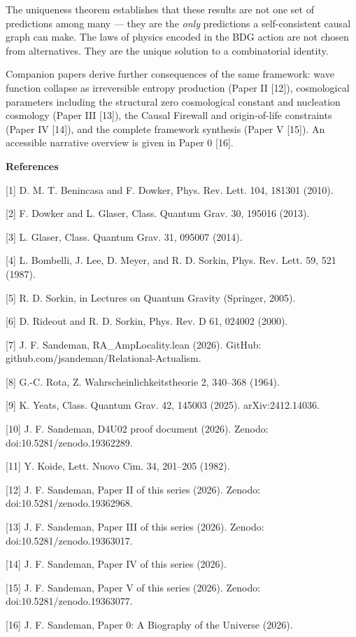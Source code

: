 \documentclass[12pt,a4paper]{article}
\begin{document}
The uniqueness theorem establishes that these results are not one set of
predictions among many --- they are the \emph{only} predictions a
self-consistent causal graph can make. The laws of physics encoded in
the BDG action are not chosen from alternatives. They are the unique
solution to a combinatorial identity.

Companion papers derive further consequences of the same framework: wave
function collapse as irreversible entropy production (Paper II
{[}12{]}), cosmological parameters including the structural zero
cosmological constant and nucleation cosmology (Paper III {[}13{]}), the
Causal Firewall and origin-of-life constraints (Paper IV {[}14{]}), and
the complete framework synthesis (Paper V {[}15{]}). An accessible
narrative overview is given in Paper 0 {[}16{]}.

\textbf{References}

{[}1{]} D. M. T. Benincasa and F. Dowker, Phys. Rev. Lett. 104, 181301
(2010).

{[}2{]} F. Dowker and L. Glaser, Class. Quantum Grav. 30, 195016 (2013).

{[}3{]} L. Glaser, Class. Quantum Grav. 31, 095007 (2014).

{[}4{]} L. Bombelli, J. Lee, D. Meyer, and R. D. Sorkin, Phys. Rev.
Lett. 59, 521 (1987).

{[}5{]} R. D. Sorkin, in Lectures on Quantum Gravity (Springer, 2005).

{[}6{]} D. Rideout and R. D. Sorkin, Phys. Rev. D 61, 024002 (2000).

{[}7{]} J. F. Sandeman, RA\_AmpLocality.lean (2026). GitHub:
github.com/jsandeman/Relational-Actualism.

{[}8{]} G.-C. Rota, Z. Wahrscheinlichkeitstheorie 2, 340--368 (1964).

{[}9{]} K. Yeats, Class. Quantum Grav. 42, 145003 (2025).
arXiv:2412.14036.

{[}10{]} J. F. Sandeman, D4U02 proof document (2026). Zenodo:
doi:10.5281/zenodo.19362289.

{[}11{]} Y. Koide, Lett. Nuovo Cim. 34, 201--205 (1982).

{[}12{]} J. F. Sandeman, Paper II of this series (2026). Zenodo:
doi:10.5281/zenodo.19362968.

{[}13{]} J. F. Sandeman, Paper III of this series (2026). Zenodo:
doi:10.5281/zenodo.19363017.

{[}14{]} J. F. Sandeman, Paper IV of this series (2026).

{[}15{]} J. F. Sandeman, Paper V of this series (2026). Zenodo:
doi:10.5281/zenodo.19363077.

{[}16{]} J. F. Sandeman, Paper 0: A Biography of the Universe (2026).
\end{document}
